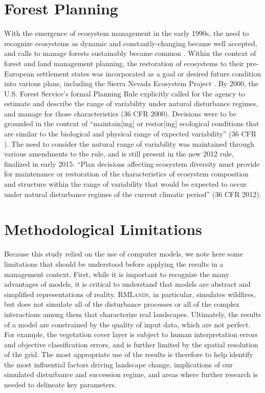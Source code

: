 \section{Forest Planning}

With the emergence of ecosystem management in the early 1990s, the need to recognize ecosystems as dynamic and constantly-changing became well accepted, and calls to manage forests sustainably became common \citep{Christensen1996}. Within the context of forest and land management planning, the restoration of ecosystems to their pre-European settlement states was incorporated as a goal or desired future condition into various plans, including the Sierra Nevada Ecosystem Project \cite{SNEP1996a}. By 2000, the U.S. Forest Service's formal Planning Rule explicitly called for the agency to estimate and describe the range of variability under natural disturbance regimes, and manage for those characteristics (36 CFR  2000). Decisions were to be grounded in the context of ``maintain[ing] or restor[ing] ecological conditions that are similar to the biological and physical range of expected variability'' (36 CFR ). The need to consider the natural range of variability was maintained through various amendments to the rule, and is still present in the new 2012 rule, finalized in early 2015: ``Plan decisions affecting ecosystem diversity must provide for maintenance or restoration of the characteristics of ecosystem composition and structure within the range of variability that would be expected to occur under natural disturbance regimes of the current climatic period'' (36 CFR  2012). 

\section{Methodological Limitations}
Because this study relied on the use of computer models, we note here some limitations that should be understood before applying the results in a management context. First, while it is important to recognize the many advantages of models, it is critical to understand that models are abstract and simplified representations of reality. \textsc{RMLands}, in particular, simulates wildfires, but does not simulate all of the disturbance processes or all of the complex interactions among them that characterize real landscapes. Ultimately, the results of a model are constrained by the quality of input data, which are not perfect. For example, the vegetation cover layer is subject to human interpretation errors and objective classification errors, and is further limited by the spatial resolution of the grid. The most appropriate use of the results is therefore to help identify the most influential factors driving landscape change, implications of our simulated disturbance and succession regime, and areas where further research is needed to delineate key parameters.

